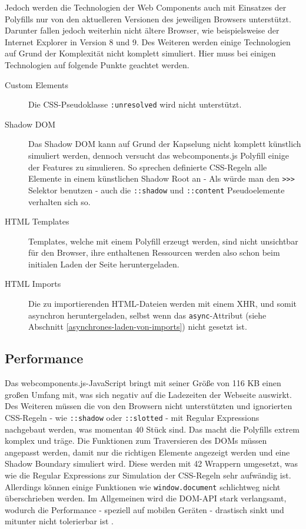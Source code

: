 Jedoch werden die Technologien der Web Components auch mit Einsatzes der Polyfills nur von den aktuelleren Versionen des jeweiligen Browsers unterstützt. Darunter fallen jedoch weiterhin nicht ältere Browser, wie beispielsweise der Internet Explorer in Version 8 und 9. Des Weiteren werden einige Technologien auf Grund der Komplexität nicht komplett simuliert. Hier muss bei einigen Technologien auf folgende Punkte geachtet werden.

\begin{description}
  \item[Custom Elements] Die \ac{CSS}-Pseudoklasse \texttt{:unresolved} wird nicht unterstützt.
  \item[Shadow \ac{DOM}] Das Shadow \ac{DOM} kann auf Grund der Kapselung nicht komplett künstlich simuliert werden, dennoch versucht das webcomponents.js Polyfill einige der Features zu simulieren. So sprechen definierte \ac{CSS}-Regeln alle Elemente in einem künstlichen Shadow Root an - Als würde man den \texttt{\textgreater{}\textgreater{}\textgreater{}} Selektor benutzen - auch die \texttt{::shadow} und \texttt{::content} Pseudoelemente verhalten sich so.
  \item[\ac{HTML} Templates] Templates, welche mit einem Polyfill erzeugt werden, sind nicht unsichtbar für den Browser, ihre enthaltenen Ressourcen werden also schon beim initialen Laden der Seite heruntergeladen.
  \item[\ac{HTML} Imports] Die zu importierenden \ac{HTML}-Dateien werden mit einem \ac{XHR}, und somit asynchron heruntergeladen, selbst wenn das \texttt{async}-Attribut (siehe Abschnitt \ref{asynchrones-laden-von-imports}) nicht gesetzt ist.
\end{description}


\subsection{Performance}\label{performance}

Das webcomponents.js-JavaScript \cite{citeulike:13914238} bringt mit seiner Größe von 116 KB einen großen Umfang mit, was sich negativ auf die Ladezeiten der Webseite auswirkt. Des Weiteren müssen die von den Browsern nicht unterstützten und ignorierten \ac{CSS}-Regeln - wie \texttt{::shadow} oder \texttt{::slotted} - mit Regular Expressions nachgebaut werden, was momentan 40 Stück sind. Das macht die Polyfills extrem komplex und träge. Die Funktionen zum Traversieren des \ac{DOM}s müssen angepasst werden, damit nur die richtigen Elemente angezeigt werden und eine Shadow Boundary simuliert wird. Diese werden mit 42 Wrappern umgesetzt, was wie die Regular Expressions zur Simulation der \ac{CSS}-Regeln sehr aufwändig ist. Allerdings können einige Funktionen wie \texttt{window.document} schlichtweg nicht überschrieben werden. Im Allgemeinen wird die \ac{DOM}-\ac{API} stark verlangsamt, wodurch die Performance - speziell auf mobilen Geräten - drastisch sinkt und mitunter nicht tolerierbar ist \cite{citeulike:13886251}.


